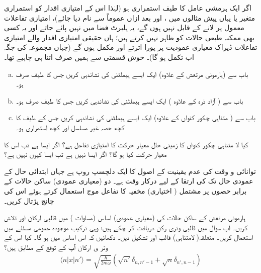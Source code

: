 اگر ایک ہرمشی عامل کا طیف استمراری ہو  (لہٰذا  اس کے امتیازی اقدار کو استمراری متغیر    یا   یہاں پیش  مثالوں   میں  ، اور  بعد ازاں  عموماً   سے نام  دیا جائے)،    امتیازی تفاعلات معمول پر لانے کے قابل نہیں ہوں گے، یہ ہلبرٹ فضا میں نہیں پائے جاتے  اور یہ  کسی بھی ممکنہ  طبعی حالات  کو ظاہر نہیں کرتے ہیں؛   ہاں حقیقی امتیازی اقدار والے  امتیازی تفاعلات   ڈیراک معیاری  عمودیت  پر پورا اترتے    اور مکمل ہوں گے (جہاں مجموعہ کی جگہ اب تکمل  ہو گا)۔  خوش قسمتی سے ہمیں صرف اتنا ہی چاہیے تھا۔
\begin{enumerate}[a.]
\item
  باب  سے   (ہارمونی مرتعش کے علاوہ)  ایک ایسے ہیملٹنی کی نشاندہی کریں  جس کا  طیف صرف   ہو۔ 
\item
باب   سے ( آزاد ذرہ کے علاوہ ) ایک  ایسے ہیملٹنی  کی نشاندہی کریں  جس کا طیف صرف  ہو۔ 
\item
 باب     سے ( متناہی چکور کنواں کے علاوہ) ایک ایسے  ہیملٹنی  کی نشاندہی کریں جس کے طیف کا کچھ حصہ غیر مسلسل اور کچھ استمراری ہو۔ 
\end{enumerate}
کیا لا متناہی چکور کنواں کا زمینی حال معیار حرکت کا  امتیازی تفاعل ہے؟ اگر ایسا ہے تب  اس کا معیار حرکت کیا ہو گا؟   اگر ایسا نہیں ہے تب  ایسا  کیوں نہیں ہے؟





توانائی  و  وقت کی عدم یقینیت کے اصول کا ایک دلچسپ روپ  ہے جہاں ابتدائی حال   کے عمودی حال تک  کی  ارتقا کے لیے درکار وقت  ہے۔ دو (معیاری عمودی) ساکن حالات کے   برابر حصوں پر مشتمل ( اختیاری)  مخفیہ  کا تفاعل موج     استعمال کرتے ہوئے اس کی چانچ    پڑتال کریں۔

ہارمونی مرتعش کے  ساکن  حالات کی (معیاری عمودی)  اساس  (مساوات ) میں قالبی ارکان     اور   تلاش کریں۔ آپ سوال  میں  قالبی وتری رکن   دریافت کر چکے ہیں؛  وہی ترکیب موجودہ عمومی مسئلے میں استعمال کریں۔  متعلقہ(  لامتناہی) قالب     اور   تشکیل دیں۔ دکھائیں کہ اس اساس میں
 ہو گا۔ کیا اس کے وتر ی ارکان آپ کے توقع کے مطابق ہیں؟
\begin{align}
\langle n|x|n'\rangle=\sqrt{\frac{\hslash}{2m\omega}}(\sqrt{n'}\delta_{n,n'-1}+\sqrt{n}\delta_{n',n-1})
\end{align}

